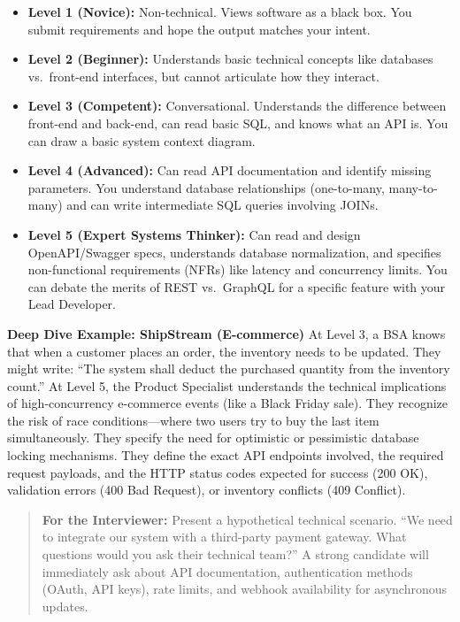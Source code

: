 \begin{itemize}
\tightlist
\item
  \textbf{Level 1 (Novice):} Non-technical. Views software as a black
  box. You submit requirements and hope the output matches your intent.
\item
  \textbf{Level 2 (Beginner):} Understands basic technical concepts like
  databases vs.~front-end interfaces, but cannot articulate how they
  interact.
\item
  \textbf{Level 3 (Competent):} Conversational. Understands the
  difference between front-end and back-end, can read basic SQL, and
  knows what an API is. You can draw a basic system context diagram.
\item
  \textbf{Level 4 (Advanced):} Can read API documentation and identify
  missing parameters. You understand database relationships
  (one-to-many, many-to-many) and can write intermediate SQL queries
  involving JOINs.
\item
  \textbf{Level 5 (Expert Systems Thinker):} Can read and design
  OpenAPI/Swagger specs, understands database normalization, and
  specifies non-functional requirements (NFRs) like latency and
  concurrency limits. You can debate the merits of REST vs.~GraphQL for
  a specific feature with your Lead Developer.
\end{itemize}

\textbf{Deep Dive Example: ShipStream (E-commerce)} At Level 3, a BSA
knows that when a customer places an order, the inventory needs to be
updated. They might write: ``The system shall deduct the purchased
quantity from the inventory count.'' At Level 5, the Product Specialist
understands the technical implications of high-concurrency e-commerce
events (like a Black Friday sale). They recognize the risk of race
conditions---where two users try to buy the last item simultaneously.
They specify the need for optimistic or pessimistic database locking
mechanisms. They define the exact API endpoints involved, the required
request payloads, and the HTTP status codes expected for success (200
OK), validation errors (400 Bad Request), or inventory conflicts (409
Conflict).

\begin{quote}
\textbf{For the Interviewer:} Present a hypothetical technical scenario.
``We need to integrate our system with a third-party payment gateway.
What questions would you ask their technical team?'' A strong candidate
will immediately ask about API documentation, authentication methods
(OAuth, API keys), rate limits, and webhook availability for
asynchronous updates.
\end{quote}

